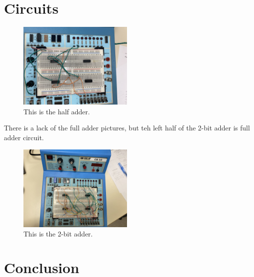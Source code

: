 \documentclass[11pt]{article}
\begin{document}
\section*{Circuits}

\begin{figure}[ht]\centering
	\includegraphics[width=0.5\textwidth]{halfadder}
	\caption{This is the half adder.}
	\label{fig:half adder}			%
\end{figure}
There is a lack of the full adder pictures, but teh left half of the  2-bit adder is full adder circuit.

\begin{figure}[ht]\centering
	\includegraphics[width=0.5\textwidth]{2-bitadder}
	\caption{This is the 2-bit adder.}
	\label{fig:2-bit adder}			%
\end{figure}

\section*{Conclusion}
\end{document}
